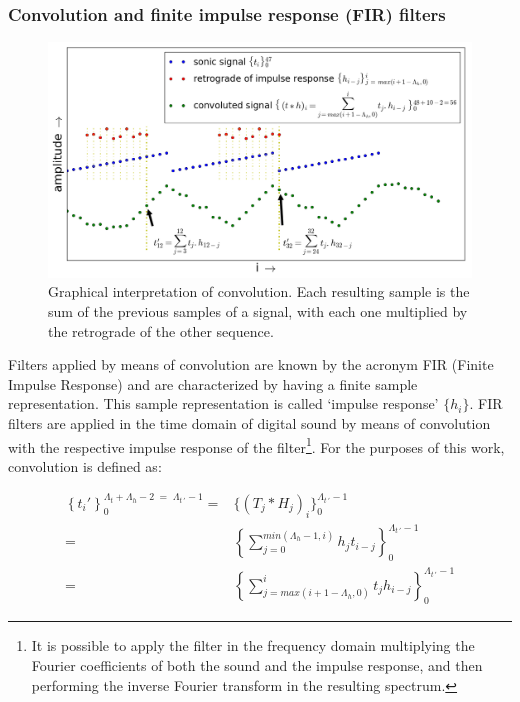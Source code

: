 \subsubsection{Convolution and finite impulse response (FIR) filters}\label{subsec:conv}
\begin{figure}
     \centering
         \includegraphics[width=\textwidth]{figures/convolucao_}
     \caption{Graphical interpretation of convolution. Each resulting sample is the sum of the previous samples of a signal, with each one multiplied by the retrograde of the other sequence.}
         \label{fig:conv}
\end{figure}

Filters applied by means of convolution are known by the acronym FIR (Finite Impulse Response) and are characterized by having a finite sample representation. This sample representation is called `impulse response' $\{h_i\}$. FIR filters are applied in the time domain of digital sound by means of convolution with the respective impulse response of the filter\footnote{It is possible to apply the filter in the frequency domain multiplying the Fourier coefficients of both the sound and the impulse response, and then performing the inverse Fourier transform in the resulting spectrum.\cite{Openheim}}. For the purposes of this work, convolution is defined as:

\begin{equation}\label{eq:conv}
 \begin{split}
 \left\{t_i'\right\}_0^{\Lambda_t+\Lambda_h-2\; = \;\Lambda_{t\, '}-1} = & \{(T_j*H_j)_i\}_0^{\Lambda_{t \, '}-1} \\ = & \left \{ \sum_{j=0}^{min(\Lambda_h-1,i)}h_{j} t_{i-j} \right \}_0^{\Lambda_{t\, '}-1} 
     \\ = & \left \{ \sum_{j=max(i+1-\Lambda_h,0)}^{i}t_j h_{i-j} \right \}_0^{\Lambda_{t\, '}-1}
 \end{split}
\end{equation}


